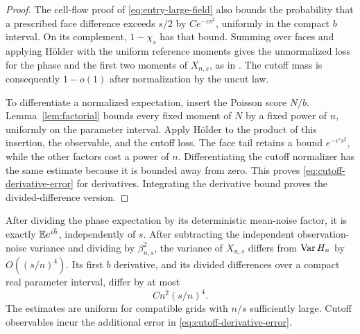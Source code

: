 \begin{proof}
The cell-flow proof of \eqref{eq:entry-large-field} also bounds the
probability that a prescribed face difference exceeds $s/2$ by
$Ce^{-cs^2}$, uniformly in the compact $b$ interval.  On its complement,
$1-\chi_s$ has that bound.  Summing over faces and applying H\"older
with the uniform reference moments gives the unnormalized loss for the
phase and the first two moments of $X_{n,s}$, as in
\cite[Lemma~4.4]{F}.  The cutoff mass is consequently $1-o(1)$ after
normalization by the uncut law.

To differentiate a normalized expectation, insert the Poisson score
$N/b$.  Lemma~\ref{lem:factorial} bounds every fixed moment of $N$ by a
fixed power of $n$, uniformly on the parameter interval.  Apply
H\"older to the product of this insertion, the observable, and the
cutoff loss.  The face tail retains a bound $e^{-c's^2}$, while the
other factors cost a power of $n$.  Differentiating the cutoff
normalizer has the same estimate because it is bounded away from zero.
This proves \eqref{eq:cutoff-derivative-error} for derivatives.
Integrating the derivative bound proves the divided-difference version.
\end{proof}

\begin{lemma}\label{lem:grid-comparison}
After dividing the phase expectation by its deterministic mean-noise
factor, it is exactly $\mathbb E e^{i\bar h}$, independently of $s$.
After subtracting the independent observation-noise variance and dividing
by $\beta_{n,s}^2$, the variance of $X_{n,s}$ differs from
$\operatorname{Var} H_n$ by $O((s/n)^4)$.  Its first $b$ derivative, and its divided
differences over a compact real parameter interval, differ by at most
\begin{equation}\label{eq:grid-derivative-error}
                                  Cn^2(s/n)^4.
\end{equation}
The estimates are uniform for compatible grids with $n/s$ sufficiently
large.  Cutoff observables incur the additional error in
\eqref{eq:cutoff-derivative-error}.
\end{lemma}

